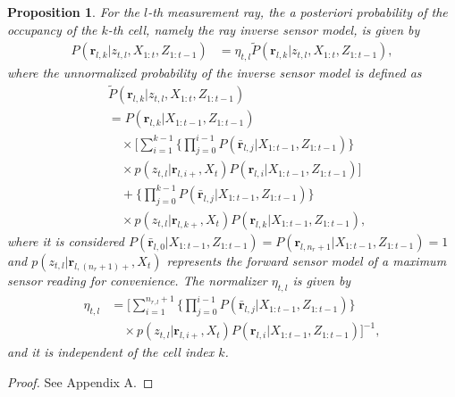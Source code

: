 \documentclass[letterpaper, 10pt, conference]{ieeeconf}
\newtheorem{prop}{Proposition}
\begin{document}
\begin{prop}
For the $l$-th measurement ray, the a posteriori probability of the occupancy of the $k$-th cell, namely the ray inverse sensor model, is given by
\begin{align}
\label{eqn:RayISMAnswer}
P(\mathbf{r}_{l,k}|z_{t,l},X_{1:t},Z_{1:t-1})&=\eta_{t,l}\tilde P(\mathbf{r}_{l,k}|z_{t,l},X_{1:t},Z_{1:t-1}),
\end{align}
where the unnormalized probability of the inverse sensor model is defined as
\begin{align}
\label{eqn:Unnormalized}
& \tilde P(\mathbf{r}_{l,k}|z_{t,l},X_{1:t},Z_{1:t-1})\nonumber\\
&=P(\mathbf{r}_{l,k}|X_{1:t-1},Z_{1:t-1})\nonumber\\
&\quad\times 
\bigg[\sum_{i=1}^{k-1}\bigg\{\prod_{j=0}^{i-1}P(\bar{\mathbf{r}}_{l,j}|X_{1:t-1},Z_{1:t-1})\bigg\}\nonumber\\
&\quad\times p(z_{t,l}|\mathbf{r}_{l,i+},X_t)P(\mathbf{r}_{l,i}|X_{1:t-1},Z_{1:t-1})\bigg]\nonumber\\
&\quad + \bigg\{\prod_{j=0}^{k-1}P(\bar{\mathbf{r}}_{l,j}|X_{1:t-1},Z_{1:t-1})\bigg\}\nonumber\\
&\quad\times p(z_{t,l}|\mathbf{r}_{l,k+},X_t)P(\mathbf{r}_{l,k}|X_{1:t-1},Z_{1:t-1}),
\end{align}
where it is considered $P(\bar{\mathbf{r}}_{l,0}|X_{1:t-1},Z_{1:t-1})=P(\mathbf{r}_{l,n_r+1}|X_{1:t-1},Z_{1:t-1})=1$ and $p(z_{t,l}|\mathbf{r}_{l,(n_r+1)+},X_t)$ represents the forward sensor model of a maximum sensor reading for convenience. The normalizer $\eta_{t,l}$ is given by
\begin{align}
\label{eqn:allEta}
\eta_{t,l}
&=
\bigg[\sum_{i=1}^{n_{r,l}+1}\bigg\{\prod_{j=0}^{i-1}P(\bar{\mathbf{r}}_{l,j}|X_{1:t-1},Z_{1:t-1})\bigg\}\nonumber\\&\quad\times p(z_{t,l}|\mathbf{r}_{l,i+},X_t)P(\mathbf{r}_{l,i}|X_{1:t-1},Z_{1:t-1})\bigg]^{-1},
\end{align}
and it is independent of the cell index $k$.
\end{prop}
\begin{proof}
See Appendix A.
\end{proof}
\end{document}
